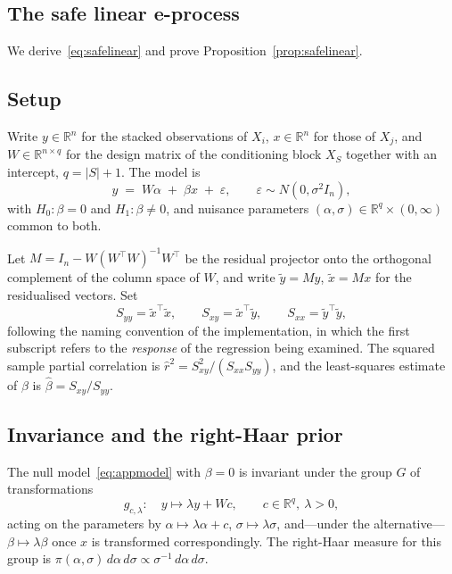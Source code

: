 \documentclass[pdflatex,sn-apa]{sn-jnl}
\theoremstyle{thmstyleone}%
\theoremstyle{thmstyletwo}%
\theoremstyle{thmstylethree}%
\newcommand{\Real}{\mathbb{R}}
\begin{document}
\begin{appendices}

\section{The safe linear e-process}\label{app:safelinear}

We derive~\eqref{eq:safelinear} and prove Proposition~\ref{prop:safelinear}.

\subsection{Setup}

Write $y \in \Real^n$ for the stacked observations of $X_i$, $x \in \Real^n$
for those of $X_j$, and $W \in \Real^{n \times q}$ for the design matrix of
the conditioning block $X_S$ together with an intercept, $q = |S| + 1$. The
model is
\begin{equation}\label{eq:appmodel}
y \;=\; W\alpha \;+\; \beta x \;+\; \varepsilon,
\qquad \varepsilon \sim N(0, \sigma^2 I_n),
\end{equation}
with $H_0 : \beta = 0$ and $H_1 : \beta \neq 0$, and nuisance parameters
$(\alpha, \sigma) \in \Real^q \times (0,\infty)$ common to both.

Let $M = I_n - W(W^\top W)^{-1} W^\top$ be the residual projector onto the
orthogonal complement of the column space of $W$, and write
$\tilde y = My$, $\tilde x = Mx$ for the residualised vectors. Set
\begin{equation*}
S_{yy} = \tilde x^\top \tilde x, \qquad
S_{xy} = \tilde x^\top \tilde y, \qquad
S_{xx} = \tilde y^\top \tilde y,
\end{equation*}
following the naming convention of the implementation, in which the first
subscript refers to the \emph{response} of the regression being examined. The
squared sample partial correlation is
$\hat r^2 = S_{xy}^2 / (S_{xx} S_{yy})$, and the least-squares estimate of
$\beta$ is $\hat\beta = S_{xy}/S_{yy}$.

\subsection{Invariance and the right-Haar prior}

The null model~\eqref{eq:appmodel} with $\beta = 0$ is invariant under the
group $G$ of transformations
\begin{equation*}
g_{c,\lambda} : \quad y \mapsto \lambda y + Wc,
\qquad c \in \Real^q, \ \lambda > 0,
\end{equation*}
acting on the parameters by $\alpha \mapsto \lambda\alpha + c$,
$\sigma \mapsto \lambda\sigma$, and---under the alternative---$\beta \mapsto
\lambda\beta$ once $x$ is transformed correspondingly. The right-Haar measure
for this group is $\pi(\alpha,\sigma)\,d\alpha\,d\sigma \propto
\sigma^{-1}\,d\alpha\,d\sigma$.


\end{appendices}
\end{document}
